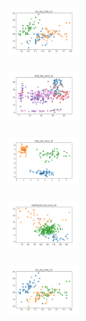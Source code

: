 \begin{figure}[H]    
    \centering
    \begin{subfigure}
        \centering
        \includegraphics[width=0.234\textwidth]{img/copkm2/iris_set_const_10_949004259_clust.png}
    \end{subfigure}
    \hfill
    \begin{subfigure}
        \centering
        \includegraphics[width=0.234\textwidth]{img/copkm2/ecoli_set_const_10_949004259_clust.png}
    \end{subfigure}
    \hfill
    \begin{subfigure}
        \centering
        \includegraphics[width=0.234\textwidth]{img/copkm2/rand_set_const_10_949004259_clust.png}
    \end{subfigure}
    \hfill
    \begin{subfigure}
        \centering
        \includegraphics[width=0.234\textwidth]{img/copkm2/newthyroid_set_const_10_949004259_clust.png}
    \end{subfigure}
    \hfill
    \begin{subfigure}
        \centering
        \includegraphics[width=0.234\textwidth]{img/copkm2/iris_set_const_10_589741062_clust.png}
    \end{subfigure}

\end{figure}
